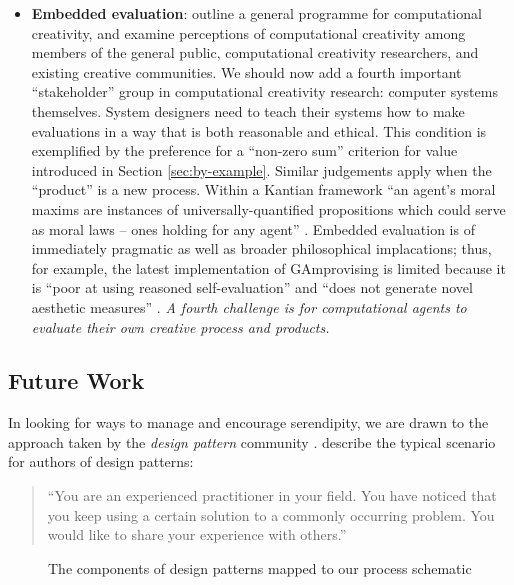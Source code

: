\begin{itemize}
\item \textbf{Embedded evaluation}:
   outline a general programme
  for computational creativity, and examine perceptions of
  computational creativity among members of the general public,
  computational creativity researchers, and existing creative
  communities.  We should now add a fourth important ``stakeholder''
  group in computational creativity research: computer systems
  themselves.  System designers need to teach their systems how to
  make evaluations in a way that is both reasonable and ethical.  This
  condition is exemplified by the preference for a ``non-zero sum''
  criterion for value introduced in Section \ref{sec:by-example}.
  Similar judgements apply when the ``product'' is a new process.
  Within a Kantian framework ``an agent's moral maxims are instances
  of universally-quantified propositions which could serve as moral
  laws -- ones holding for any
  agent'' \cite{powers2005deontological}.
  Embedded evaluation is of immediately pragmatic as well as broader philosophical implacations;
  thus, for example, the latest implementation of {\sf GAmprovising} is limited
  because it is ``poor at using reasoned self-evaluation''
  and ``does not generate novel aesthetic measures''  \cite[pp.~189, 288]{jordanous2012evaluating}.
  \emph{A fourth challenge is for computational agents to evaluate
    their own creative process and products.}
\end{itemize}


\subsection{Future Work} \label{sec:futurework} \label{sec:hatching}

In looking for ways to manage and encourage serendipity, we are drawn
to the approach taken by the \emph{design pattern} community
\cite{alexander1999origins}. 
 describe the typical scenario for authors of design patterns:

\begin{quote}
\noindent ``You are an experienced practitioner in your field.  You
have noticed that you keep using a certain solution to a commonly
occurring problem.  You would like to share your experience with
others.''
\end{quote}

\begin{figure}[!t]
\vspace{.3cm}

\vspace{-.3cm}
\caption{The components of design patterns mapped to our process schematic\label{fig:pattern-schematic}}
\vspace{.5cm}
\end{figure}


